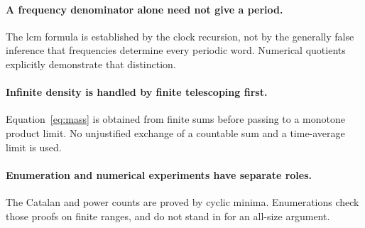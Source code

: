 \documentclass[11pt,letterpaper]{article}
\theoremstyle{definition}
\begin{document}
\paragraph{A frequency denominator alone need not give a period.}
The lcm formula is established by the clock recursion, not by the generally
false inference that frequencies determine every periodic word. Numerical
quotients explicitly demonstrate that distinction.

\paragraph{Infinite density is handled by finite telescoping first.}
Equation~\eqref{eq:mass} is obtained from finite sums before passing to a
monotone product limit. No unjustified exchange of a countable sum and a
time-average limit is used.

\paragraph{Enumeration and numerical experiments have separate roles.}
The Catalan and power counts are proved by cyclic minima. Enumerations check
those proofs on finite ranges, and do not stand in for an all-size argument.
\end{document}
